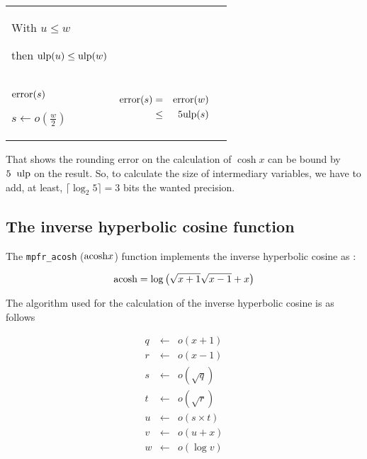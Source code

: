 \documentclass[12pt]{amsart}
\def\n{\textnormal}
\def\ulp{{\rm ulp}}
\begin{document}
\begin{center}
\begin{tabular}{l l l}
\begin{minipage}{6cm}
With $u \leq w$ 

then $\ulp(u) \leq \ulp(w)$

\end{minipage}\\%
\begin{minipage}{2.5cm}
${\textnormal{error}}(s)$

$s \leftarrow o(\frac{w}{2}) $
\end{minipage} &
\begin{minipage}{7.5cm}

\begin{center}


\begin{eqnarray}\nonumber
 {\textnormal{error}}(s) & = &  {\textnormal{error}}(w)\\\nonumber
 & \leq &  5\ulp(s)
\end{eqnarray}



\end{center}

\end{minipage} &
\begin{minipage}{6cm}


\end{minipage}


\end{tabular}
\end{center}

That shows the rounding error on the calculation of $\cosh x$ can be
bound by $5 \;\; \ulp$ on the result. So, to calculate the size of
intermediary variables, we have to add, at least, $\lceil \log_2 5 \rceil=3$ bits the wanted
precision.
 
\subsection{The inverse hyperbolic cosine function}

The {\tt mpfr\_acosh} ($\n{acosh}{x}$) function implements the inverse hyperbolic
cosine as :

$$
\n{acosh} = \log \left( \sqrt{x+1} \sqrt{x-1} + x \right) 
$$

The algorithm used for the calculation of the inverse hyperbolic cosine is as follows

\begin{eqnarray}\nonumber
q&\leftarrow&o(x+1)\\\nonumber
r&\leftarrow&o(x-1)\\\nonumber
s&\leftarrow&o(\sqrt{q})\\\nonumber
t&\leftarrow&o(\sqrt{r})\\\nonumber
u&\leftarrow&o(s \times t)\\\nonumber
v&\leftarrow&o(u+x)\\\nonumber
w&\leftarrow&o(\log  v)
\end{eqnarray}
\end{document}
